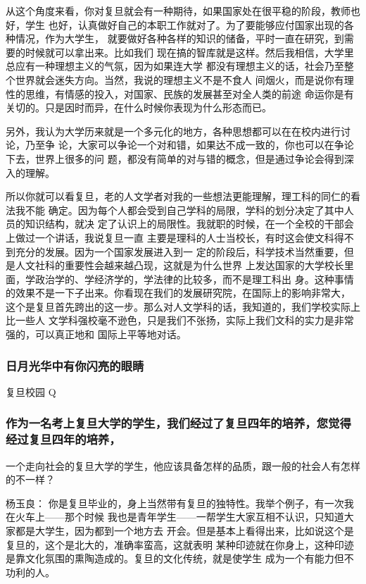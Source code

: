 \documentclass[11pt]{ctexart}
\begin{document}
{{{{从这个角度来看，你对复旦就会有一种期待，如果国家处在很平稳的阶段，教师也好，学生
也好，认真做好自己的本职工作就对了。为了要能够应付国家出现的各种情况，作为大学生，
就要做好各种各样的知识的储备，平时一直在研究，到需要的时候就可以拿出来。比如我们
现在搞的智库就是这样。然后我相信，大学里总应有一种理想主义的气氛，因为如果连大学
都没有理想主义的话，社会乃至整个世界就会迷失方向。当然，我说的理想主义不是不食人
间烟火，而是说你有理性的思维，有情感的投入，对国家、民族的发展甚至对全人类的前途
命运你是有关切的。只是因时而异，在什么时候你表现为什么形态而已。

另外，我认为大学历来就是一个多元化的地方，各种思想都可以在在校内进行讨论，乃至争
论，大家可以争论一个对和错，如果达不成一致的，你也可以在争论下去，世界上很多的问
题，都没有简单的对与错的概念，但是通过争论会得到深入的理解。

所以你就可以看复旦，老的人文学者对我的一些想法更能理解，理工科的同仁的看法我不能
确定。因为每个人都会受到自己学科的局限，学科的划分决定了其中人员的知识结构，就决
定了认识上的局限性。我就职的时候，在一个全校的干部会上做过一个讲话，我说复旦一直
主要是理科的人士当校长，有时这会使文科得不到充分的发展。因为一个国家发展进入到一
定的阶段后，科学技术当然重要，但是人文社科的重要性会越来越凸现，这就是为什么世界
上发达国家的大学校长里面，学政治学的、学经济学的，学法律的比较多，而不是理工科出
身。这种事情的效果不是一下子出来。你看现在我们的发展研究院，在国际上的影响非常大，
这个是复旦首先跨出的这一步。那么对人文学科的话，我知道的，我们学校实际上比一些人
文学科强校毫不逊色，只是我们不张扬，实际上我们文科的实力是非常强的，可以真正地和
国际上平等地对话。

\subsubsection{日月光华中有你闪亮的眼睛}
\label{sec:org94f64ff}

复旦校园
Q
\subsubsection{作为一名考上复旦大学的学生，我们经过了复旦四年的培养，您觉得经过复旦四年的培养，}
\label{sec:org555e2c8}
一个走向社会的复旦大学的学生，他应该具备怎样的品质，跟一般的社会人有怎样的不一样？

杨玉良：
你是复旦毕业的，身上当然带有复旦的独特性。我举个例子，有一次我在火车上——那个时候
我也是青年学生——一帮学生大家互相不认识，只知道大家都是大学生，因为都到一个地方去
开会。但是基本上看得出来，比如说这个是复旦的，这个是北大的，准确率蛮高，这就表明
某种印迹就在你身上，这种印迹是靠文化氛围的熏陶造成的。复旦的文化传统，就是使学生
成为一个有能力但不功利的人。

}}}}
\end{document}
